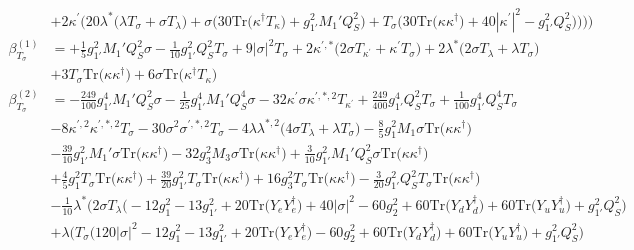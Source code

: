{\begin{align}
 &+2 \kappa^\prime \Big(20 \lambda^* \Big(\lambda T_{\sigma}  + \sigma T_{\lambda} \Big) + \sigma \Big(30 \mbox{Tr}\Big({\kappa^{\dagger}  T_{\kappa}}\Big)  + g_{1'}^{2} M_1' Q_{S}^{2} \Big) + T_{\sigma} \Big(30 \mbox{Tr}\Big({\kappa  \kappa^{\dagger}}\Big)  + 40 |\kappa^\prime|^2  - g_{1'}^{2} Q_{S}^{2} \Big)\Big)\Big)\Big)\\ 
\beta_{T_{\sigma}}^{(1)} & =  
+\frac{1}{5} g_{1'}^{2} M_1' Q_{S}^{2} \sigma -\frac{1}{10} g_{1'}^{2} Q_{S}^{2} T_{\sigma} +9 |\sigma|^2 T_{\sigma} +2 \kappa^{\prime,*} \Big(2 \sigma T_{\kappa^\prime}  + \kappa^\prime T_{\sigma} \Big)+2 \lambda^* \Big(2 \sigma T_{\lambda}  + \lambda T_{\sigma} \Big)\nonumber \\ 
 &+3 T_{\sigma} \mbox{Tr}\Big({\kappa  \kappa^{\dagger}}\Big) +6 \sigma \mbox{Tr}\Big({\kappa^{\dagger}  T_{\kappa}}\Big) \\ 
\beta_{T_{\sigma}}^{(2)} & =  
-\frac{249}{100} g_{1'}^{4} M_1' Q_{S}^{2} \sigma -\frac{1}{25} g_{1'}^{4} M_1' Q_{S}^{4} \sigma -32 \kappa^\prime \sigma \kappa^{\prime,*,2} T_{\kappa^\prime} +\frac{249}{400} g_{1'}^{4} Q_{S}^{2} T_{\sigma} +\frac{1}{100} g_{1'}^{4} Q_{S}^{4} T_{\sigma} \nonumber \\ 
 &-8 \kappa^{\prime,2} \kappa^{\prime,*,2} T_{\sigma} -30 \sigma^{2} \sigma^{\prime,*,2} T_{\sigma} -4 \lambda \lambda^{*,2} \Big(4 \sigma T_{\lambda}  + \lambda T_{\sigma} \Big)-\frac{8}{5} g_{1}^{2} M_1 \sigma \mbox{Tr}\Big({\kappa  \kappa^{\dagger}}\Big) \nonumber \\ 
 &-\frac{39}{10} g_{1'}^{2} M_1' \sigma \mbox{Tr}\Big({\kappa  \kappa^{\dagger}}\Big) -32 g_{3}^{2} M_3 \sigma \mbox{Tr}\Big({\kappa  \kappa^{\dagger}}\Big) +\frac{3}{10} g_{1'}^{2} M_1' Q_{S}^{2} \sigma \mbox{Tr}\Big({\kappa  \kappa^{\dagger}}\Big) \nonumber \\ 
 &+\frac{4}{5} g_{1}^{2} T_{\sigma} \mbox{Tr}\Big({\kappa  \kappa^{\dagger}}\Big) +\frac{39}{20} g_{1'}^{2} T_{\sigma} \mbox{Tr}\Big({\kappa  \kappa^{\dagger}}\Big) +16 g_{3}^{2} T_{\sigma} \mbox{Tr}\Big({\kappa  \kappa^{\dagger}}\Big) -\frac{3}{20} g_{1'}^{2} Q_{S}^{2} T_{\sigma} \mbox{Tr}\Big({\kappa  \kappa^{\dagger}}\Big) \nonumber \\ 
 &-\frac{1}{10} \lambda^* \Big(2 \sigma T_{\lambda} \Big(-12 g_{1}^{2}  -13 g_{1'}^{2}  + 20 \mbox{Tr}\Big({Y_e  Y_{e}^{\dagger}}\Big)  + 40 |\sigma|^2  -60 g_{2}^{2}  + 60 \mbox{Tr}\Big({Y_d  Y_{d}^{\dagger}}\Big)  + 60 \mbox{Tr}\Big({Y_u  Y_{u}^{\dagger}}\Big)  + g_{1'}^{2} Q_{S}^{2} \Big)\nonumber \\ 
 &+\lambda \Big(T_{\sigma} \Big(120 |\sigma|^2  -12 g_{1}^{2}  -13 g_{1'}^{2}  + 20 \mbox{Tr}\Big({Y_e  Y_{e}^{\dagger}}\Big)  -60 g_{2}^{2}  + 60 \mbox{Tr}\Big({Y_d  Y_{d}^{\dagger}}\Big)  + 60 \mbox{Tr}\Big({Y_u  Y_{u}^{\dagger}}\Big)  + g_{1'}^{2} Q_{S}^{2} \Big)\nonumber \\ 

\end{align}}
